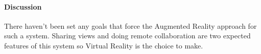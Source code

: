 
\paragraph{Discussion}
There haven't been set any goals that force the Augmented Reality approach for such a system.
Sharing views and doing remote collaboration are two expected features of this system so
Virtual Reality is the choice to make.


%
